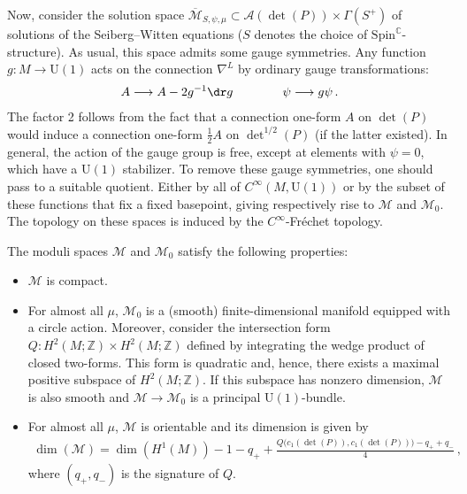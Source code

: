    Now, consider the solution space $\overline{\mathcal{M}}_{S,\psi,\mu}\subset\mathcal{A}(\det(P))\times\Gamma(S^+)$ of solutions of the Seiberg--Witten equations ($S$ denotes the choice of $\mathrm{Spin}^{\mathbb{C}}$-structure). As usual, this space admits some gauge symmetries. Any function $g:M\rightarrow\mathrm{U}(1)$ acts on the connection $\nabla^L$ by ordinary gauge transformations:
    \begin{gather}
        A\longrightarrow A-2g^{-1}\dr g\qquad\qquad\psi\longrightarrow g\psi\,.
    \end{gather}
    The factor 2 follows from the fact that a connection one-form $A$ on $\det(P)$ would induce a connection one-form $\frac{1}{2}A$ on $\det^{1/2}(P)$ (if the latter existed). In general, the action of the gauge group is free, except at elements with $\psi=0$, which have a $\mathrm{U}(1)$ stabilizer. To remove these gauge symmetries, one should pass to a suitable quotient. Either by all of $C^\infty(M,\mathrm{U}(1))$ or by the subset of these functions that fix a fixed basepoint, giving respectively rise to $\mathcal{M}$ and $\mathcal{M}_0$. The topology on these spaces is induced by the $C^\infty$-Fr\'echet topology.

    \begin{property}
        The moduli spaces $\mathcal{M}$ and $\mathcal{M}_0$ satisfy the following properties:
        \begin{itemize}
            \item $\mathcal{M}$ is compact.
            \item For almost all $\mu$, $\mathcal{M}_0$ is a (smooth) finite-dimensional manifold equipped with a circle action. Moreover, consider the intersection form $Q:H^2(M;\mathbb{Z})\times H^2(M;\mathbb{Z})$ defined by integrating the wedge product of closed two-forms. This form is quadratic and, hence, there exists a maximal positive subspace of $H^2(M;\mathbb{Z})$. If this subspace has nonzero dimension, $\mathcal{M}$ is also smooth and $\mathcal{M}\rightarrow\mathcal{M}_0$ is a principal $\mathrm{U}(1)$-bundle.
            \item For almost all $\mu$, $\mathcal{M}$ is orientable and its dimension is given by
                \begin{gather}
                    \dim(\mathcal{M}) = \dim(H^1(M)) - 1 - q_+ + \frac{Q\bigl(c_1(\det(P)),c_1(\det(P))\bigr)-q_++q_-}{4}\,,
                \end{gather}
                where $(q_+,q_-)$ is the signature of $Q$.
        \end{itemize}
    \end{property}


